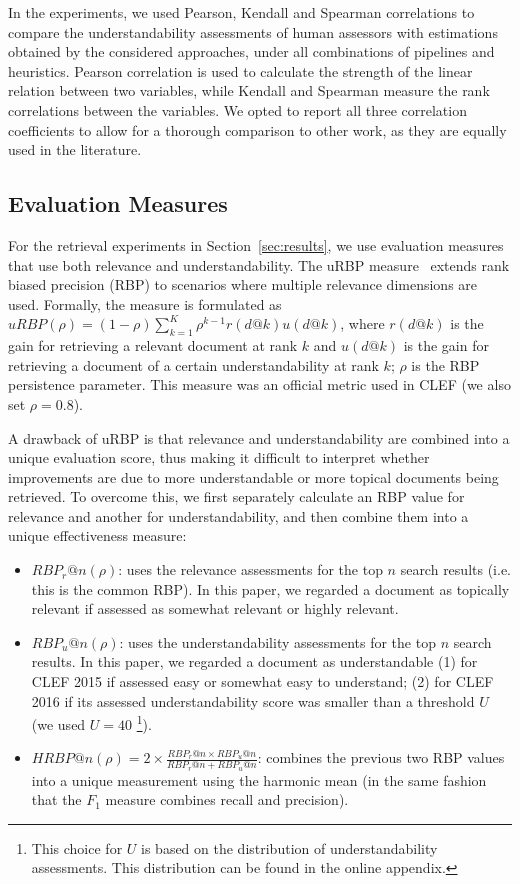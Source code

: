 In the experiments, we used Pearson, Kendall and Spearman correlations to compare the understandability assessments of human assessors with estimations obtained by the considered approaches, under all combinations of pipelines and heuristics. Pearson correlation is used to calculate the strength of the linear relation between two variables, while Kendall and Spearman measure the rank correlations between the variables. We opted to report all three correlation coefficients to allow for a thorough comparison to other work, as they are equally used in the literature. 

\subsection{Evaluation Measures}

For the retrieval experiments in Section~\ref{sec:results}, we use evaluation measures that use both relevance and understandability. The uRBP measure~\cite{zuccon2016understandability} extends rank biased precision (RBP) to scenarios where multiple relevance dimensions are used. Formally, the measure is formulated as $uRBP(\rho) = (1 - \rho) \sum_{k=1}^{K} \rho^{k-1} r(d@k) u(d@k)$, where $r(d@k)$ is the gain for retrieving a relevant document at rank $k$ and $u(d@k)$ is the gain for retrieving a document of a certain understandability at rank $k$; $\rho$ is the RBP persistence parameter. This measure was an official metric used in CLEF (we also set $\rho=0.8$). 

A drawback of uRBP is that relevance and understandability are combined into a unique evaluation score, thus making it difficult to interpret whether improvements are due to more understandable or more topical documents being retrieved. To overcome this, we first separately calculate an RBP value for relevance and another for understandability, and then combine them into a unique effectiveness measure:

\begin{itemize}[leftmargin=*]
	\item $RBP_r@n(\rho)$: uses the relevance assessments for the top $n$ search results (i.e. this is the common RBP). In this paper, we regarded a document as topically relevant if assessed as somewhat relevant or highly relevant.
	
    \item $RBP_u@n(\rho)$: uses the understandability assessments for the top $n$ search results. In this paper, we regarded a document as understandable (1) for CLEF 2015 if assessed easy or somewhat easy to understand; (2) for CLEF 2016 if its assessed understandability score was smaller than a threshold $U$ (we used $U = 40$ \footnote{This choice for $U$ is based on the distribution of understandability assessments. This distribution can be found in the online appendix.}).
	
    \item $HRBP@n(\rho) = 2 \times \frac{RBP_r@n \times RBP_u@n}{RBP_r@n + RBP_u@n}$: combines the previous two RBP values into a unique measurement using the harmonic mean (in the same fashion that the $F_1$ measure combines recall and precision).
\end{itemize}

